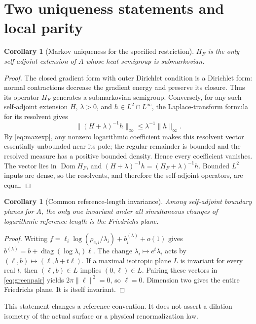 \documentclass[11pt]{article}
\newtheorem{corollary}[theorem]{Corollary}
\theoremstyle{remark}\newtheorem{remark}[theorem]{Remark}
\newcommand{\Dom}{\operatorname{Dom}}\newcommand{\dd}{\,d}
\newcommand{\norm}[1]{\lVert#1\rVert}
\begin{document}
\section{Two uniqueness statements and local parity}\label{sec:uniqueness}
\begin{corollary}[Markov uniqueness for the specified restriction]\label{cor:markov}
$H_F$ is the only self-adjoint extension of $A$ whose heat semigroup is
submarkovian.
\end{corollary}
\begin{proof}
The closed gradient form with outer Dirichlet condition is a Dirichlet form:
normal contractions decrease the gradient energy and preserve its closure.
Thus its operator $H_F$ generates a submarkovian semigroup.
Conversely, for any such self-adjoint extension $H$, $\lambda>0$, and
$h\in L^2\cap L^\infty$, the Laplace-transform formula for its resolvent
gives
\[
 \norm{(H+\lambda)^{-1}h}_\infty\leq\lambda^{-1}\norm h_\infty.
\]
By \eqref{eq:maxexp}, any nonzero logarithmic coefficient makes this
resolvent vector essentially unbounded near its pole; the regular remainder
is bounded and the resolved measure has a positive bounded density.
Hence every coefficient vanishes. The vector lies in $\Dom H_F$, and
$(H+\lambda)^{-1}h=(H_F+\lambda)^{-1}h$. Bounded $L^2$ inputs are dense,
so the resolvents, and therefore the self-adjoint operators, are equal.
\end{proof}

\begin{corollary}[Common reference-length invariance]\label{cor:scale}
Among self-adjoint boundary planes for $A$, the only one invariant under all
simultaneous changes of logarithmic reference length is the Friedrichs plane.
\end{corollary}
\begin{proof}
Writing $f=\ell_i\log(\rho_{e,i}/\lambda_i)+b_i^{(\lambda)}+o(1)$ gives
$b^{(\lambda)}=b+\operatorname{diag}(\log\lambda_i)\ell$.
The change $\lambda_i\mapsto e^t\lambda_i$ acts by
$(\ell,b)\mapsto(\ell,b+t\ell)$. If a maximal isotropic plane $L$ is
invariant for every real $t$, then $(\ell,b)\in L$ implies $(0,\ell)\in L$.
Pairing these vectors in \eqref{eq:greenpair} yields
$2\pi\norm\ell^2=0$, so $\ell=0$. Dimension two gives the entire
Friedrichs plane. It is itself invariant.
\end{proof}
This statement changes a reference convention. It does not assert a dilation
isometry of the actual surface or a physical renormalization law.
\end{document}
